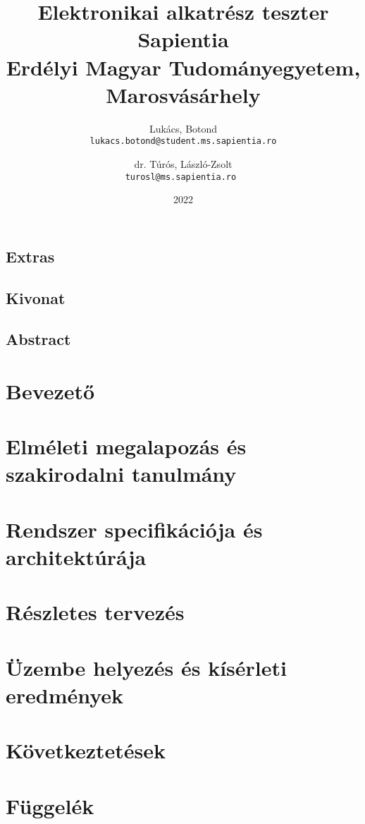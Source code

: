 \documentclass[12pt, twosides]{report}
\title{
	{Elektronikai alkatrész teszter}\\
	{\large Sapientia\\
	Erdélyi Magyar Tudományegyetem, Marosvásárhely}
}
\author{
	Lukács, Botond\\
	\texttt{lukacs.botond@student.ms.sapientia.ro}
	\and
	dr. Túrós, László-Zsolt\\
	\texttt{turosl@ms.sapientia.ro }	
}
\date{2022}
\begin{document}



\section*{Extras}

\pagebreak



\section*{Kivonat}

\pagebreak

\section*{Abstract}

\pagebreak


\tableofcontents

\listoffigures

\chapter{Bevezető}


\chapter{Elméleti megalapozás és szakirodalni tanulmány}


\chapter{Rendszer specifikációja és architektúrája}


\chapter{Részletes tervezés}


\chapter{Üzembe helyezés és kísérleti eredmények}


\chapter{Következtetések}






\appendix
\chapter{Függelék}

\end{document}
